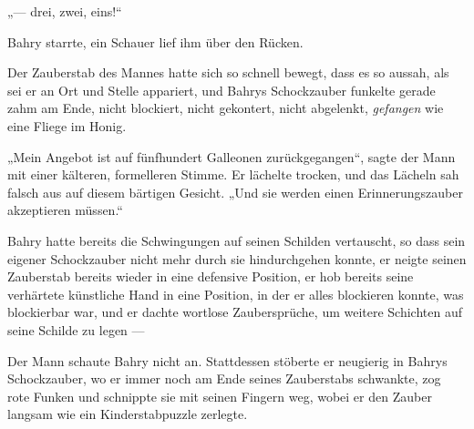 „— drei, zwei, eins!“ 

\later

Bahry starrte, ein Schauer lief ihm über den Rücken.

Der Zauberstab des Mannes hatte sich so schnell bewegt, dass es so aussah, als sei er an Ort und Stelle appariert, und Bahrys Schockzauber funkelte gerade zahm am Ende, nicht blockiert, nicht gekontert, nicht abgelenkt, \emph{gefangen} wie eine Fliege im Honig.

„Mein Angebot ist auf fünfhundert Galleonen zurückgegangen“, sagte der Mann mit einer kälteren, formelleren Stimme. Er lächelte trocken, und das Lächeln sah falsch aus auf diesem bärtigen Gesicht.
„Und sie werden einen Erinnerungszauber akzeptieren müssen.“

Bahry hatte bereits die Schwingungen auf seinen Schilden vertauscht, so dass sein eigener Schockzauber nicht mehr durch sie hindurchgehen konnte, er neigte seinen Zauberstab bereits wieder in eine defensive Position, er hob bereits seine verhärtete künstliche Hand in eine Position, in der er alles blockieren konnte, was blockierbar war, und er dachte wortlose Zaubersprüche, um weitere Schichten auf seine Schilde zu legen —

Der Mann schaute Bahry nicht an. Stattdessen stöberte er neugierig in Bahrys Schockzauber, wo er immer noch am Ende seines Zauberstabs schwankte, zog rote Funken und schnippte sie mit seinen Fingern weg, wobei er den Zauber langsam wie ein Kinderstabpuzzle zerlegte.

